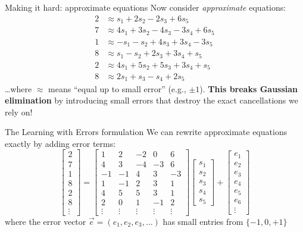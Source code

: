 \ifdefined\PRESENTATION\else\PassOptionsToClass{handout}{beamer}\fi\documentclass[aspectratio=169, lualatex]{beamer}
\begin{document}
\begin{frame}{Making it hard: approximate equations}
	Now consider \textit{approximate} equations:
	\begin{align*}
		2 & \approx s_1 + 2s_2 - 2s_3 + 6s_5         \\
		7 & \approx 4s_1 + 3s_2 - 4s_3 - 3s_4 + 6s_5 \\
		1 & \approx -s_1 - s_2 + 4s_3 + 3s_4 - 3s_5  \\
		8 & \approx s_1 - s_2 + 2s_3 + 3s_4 + s_5    \\
		2 & \approx 4s_1 + 5s_2 + 5s_3 + 3s_4 + s_5  \\
		8 & \approx 2s_1 + s_3 - s_4 + 2s_5
	\end{align*}
	\ldots where $\approx$ means ``equal up to small error'' (e.g., $\pm 1$). \textbf{This breaks Gaussian elimination} by introducing small errors that destroy the exact cancellations we rely on!
\end{frame}

\begin{frame}{The Learning with Errors formulation}
	We can rewrite approximate equations exactly by adding error terms:
	\[
		\begin{bmatrix}
			2 \\ 7 \\ 1 \\ 8 \\ 2 \\ 8 \\ \vdots
		\end{bmatrix}
		=
		\begin{bmatrix}
			1      & 2      & -2     & 0      & 6      \\
			4      & 3      & -4     & -3     & 6      \\
			-1     & -1     & 4      & 3      & -3     \\
			1      & -1     & 2      & 3      & 1      \\
			4      & 5      & 5      & 3      & 1      \\
			2      & 0      & 1      & -1     & 2      \\
			\vdots & \vdots & \vdots & \vdots & \vdots
		\end{bmatrix}
		\begin{bmatrix}
			s_1 \\ s_2 \\ s_3 \\ s_4 \\ s_5
		\end{bmatrix}
		+
		\begin{bmatrix}
			e_1 \\ e_2 \\ e_3 \\ e_4 \\ e_5 \\ e_6 \\ \vdots
		\end{bmatrix}
	\]
	where the error vector $\vec{e} = (e_1, e_2, e_3, \ldots)$ has small entries from $\{-1, 0, +1\}$
\end{frame}
\end{document}
